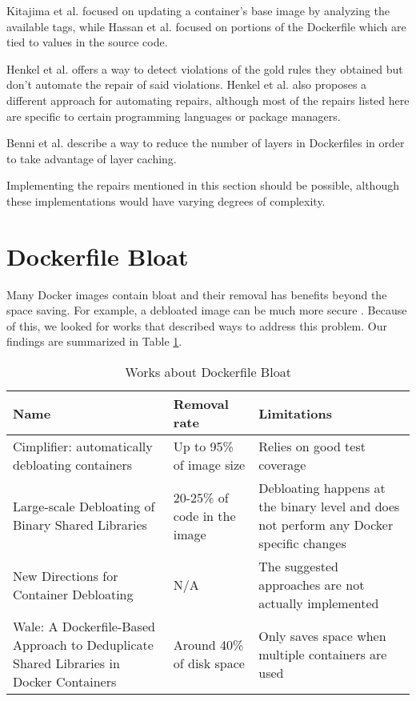Kitajima et al. \cite{kitajimaLatestImageRecommendation2020} focused on updating a container's base image by analyzing the available tags, while Hassan et al. \cite{hassanRUDSEARecommendingUpdates2018} focused on portions of the Dockerfile which are tied to values in the source code.

Henkel et al. \cite{henkelLearningUnderstandingSupporting2020} offers a way to detect violations of the gold rules they obtained but don't automate the repair of said violations. Henkel et al. \cite{henkelShipwrightHumanintheLoopSystem2021} also proposes a different approach for automating repairs, although most of the repairs listed here are specific to certain programming languages or package managers.

Benni et al. \cite{benniSupportingMicroservicesDeployment2018} describe a way to reduce the number of layers in Dockerfiles in order to take advantage of layer caching.

Implementing the repairs mentioned in this section should be possible, although these implementations would have varying degrees of complexity.

\section{Dockerfile Bloat} \label{sec:dockerfile_bloat}

Many Docker images contain bloat \cite{rastogiCimplifierAutomaticallyDebloating2017} and their removal has benefits beyond the space saving. For example, a debloated image can be much more secure \cite{ahmedSecurityAnalysisCode2022}. Because of this, we looked for works that described ways to address this problem. Our findings are summarized in Table \ref{tab:works_dockerfile_bloat}.

\begin{table}[H]
    \centering
    \begin{tabular}{|p{}|p{}|p{}|}
        \hline \textbf{Name} & \textbf{Removal rate} & \textbf{Limitations} \\
        \hline Cimplifier: automatically debloating containers \cite{rastogiCimplifierAutomaticallyDebloating2017} & Up to 95\% of image size & Relies on good test coverage \\
        \hline Large-scale Debloating of Binary Shared Libraries \cite{agadakosLargescaleDebloatingBinary2020} & 20-25\% of code in the image & Debloating happens at the binary level and does not perform any Docker specific changes \\
        \hline New Directions for Container Debloating \cite{rastogiNewDirectionsContainer2017} & N/A & The suggested approaches are not actually implemented \\
        \hline Wale: A Dockerfile-Based Approach to Deduplicate Shared Libraries in Docker Containers \cite{santoroWaleDockerfileBasedApproach2018} & Around 40\% of disk space & Only saves space when multiple containers are used \\
        \hline
    \end{tabular}
    \caption{Works about Dockerfile Bloat}
    \label{tab:works_dockerfile_bloat}
\end{table}

